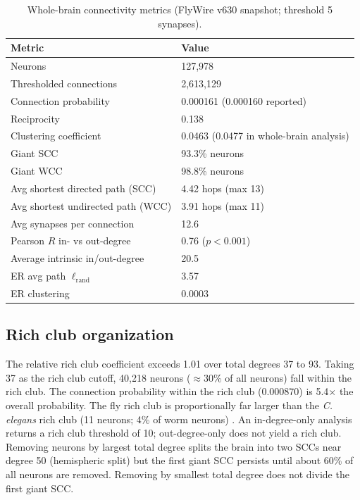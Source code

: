 \documentclass[11pt]{article}
\begin{document}
\begin{table}[h]
\centering
\caption{Whole-brain connectivity metrics (FlyWire v630 snapshot; threshold 5 synapses).}
\begin{tabular}{ll}
\toprule
Metric & Value \\
\midrule
Neurons & 127{,}978 \\
Thresholded connections & 2{,}613{,}129 \\
Connection probability & 0.000161 (0.000160 reported) \\
Reciprocity & 0.138 \\
Clustering coefficient & 0.0463 (0.0477 in whole-brain analysis) \\
Giant SCC & 93.3\% neurons \\
Giant WCC & 98.8\% neurons \\
Avg shortest directed path (SCC) & 4.42 hops (max 13) \\
Avg shortest undirected path (WCC) & 3.91 hops (max 11) \\
Avg synapses per connection & 12.6 \\
Pearson $R$ in- vs out-degree & 0.76 ($p < 0.001$) \\
Average intrinsic in/out-degree & 20.5 \\
ER avg path $\ell_{\mathrm{rand}}$ & 3.57 \\
ER clustering & 0.0003 \\
\bottomrule
\end{tabular}
\end{table}

\subsection{Rich club organization}
The relative rich club coefficient exceeds 1.01 over total degrees 37 to 93. Taking 37 as the rich club cutoff, 40{,}218 neurons ($\approx$30\% of all neurons) fall within the rich club. The connection probability within the rich club (0.000870) is 5.4$\times$ the overall probability. The fly rich club is proportionally far larger than the \emph{C. elegans} rich club (11 neurons; 4\% of worm neurons) \cite{towlson2013rich}. An in-degree-only analysis returns a rich club threshold of 10; out-degree-only does not yield a rich club. Removing neurons by largest total degree splits the brain into two SCCs near degree 50 (hemispheric split) but the first giant SCC persists until about 60\% of all neurons are removed. Removing by smallest total degree does not divide the first giant SCC.
\end{document}
